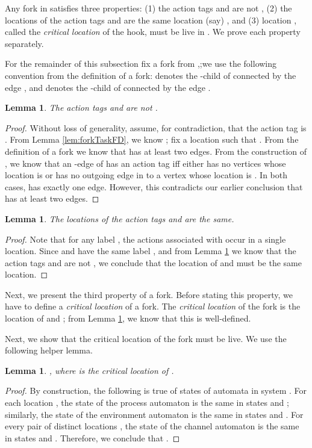 \documentclass[11pt]{article}
\numberwithin{theorem}{section}
\newtheorem{lemma}[theorem]{Lemma}
\begin{document}
Any fork  in  satisfies three properties: (1) the action tags  and  are not , (2) the locations of the action tags  and  are the same location (say) , and (3) location , called the \emph{critical location} of the hook, must be live in . We prove each property separately.

For the remainder of this subsection fix a fork  from ,;we use the following convention from the definition of a fork:  denotes the -child of  connected by the edge , and  denotes the -child of  connected by the edge .

\begin{lemma}\label{lem:forkEventTagsNotBot}
The action tags  and  are not .
\end{lemma}
\begin{proof}
Without loss of generality, assume, for contradiction, that the action tag  is . 
From Lemma \ref{lem:forkTaskFD}, we know ; fix a location  such that . 
From the definition of a fork we know that  has at least two  edges. 
From the construction of , we know that an -edge of  has an action tag  iff either  has no vertices whose location is  or  has no outgoing edge in  to a vertex whose location is . In both cases,  has exactly one  edge. However, this contradicts our earlier conclusion that  has at least two  edges.
\end{proof}

\begin{lemma}\label{thm:forkSameCriticalProcess}
The locations of the action tags  and  are the same.
\end{lemma}
\begin{proof}
Note that for any label , the actions associated with  occur in a single location. Since  and  have the same label , and from Lemma \ref{lem:forkEventTagsNotBot} we know that the action tags  and  are not , we conclude that the location of  and  must be the same location.
\end{proof}

Next, we present the third property of a fork. Before stating this property, we have to define a \emph{critical location} of a fork. The \emph{critical location} of the fork  is the location of  and ; from Lemma \ref{thm:forkSameCriticalProcess}, we know that this is well-defined.

Next, we show that the critical location of the fork  must be live. We use the following helper lemma.

\begin{lemma}\label{lem:forkSimilarModuloCriticalLocation}
, where  is the critical location of .
\end{lemma}
\begin{proof}
By construction, the following is true of states of automata in system . For each location , the state of the process automaton  is the same in states  and ; similarly, the state of the environment automaton  is the same in states  and . For every pair of distinct locations , the state of the channel automaton  is the same in states  and . Therefore, we conclude that .
\end{proof}
\end{document}
